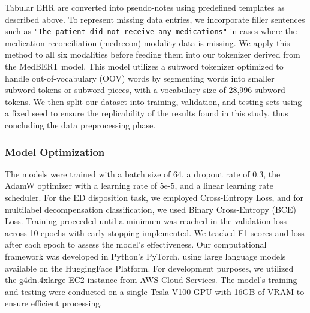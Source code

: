\documentclass[pmlr]{jmlr}%
\begin{document}
{Tabular EHR are converted into pseudo-notes using predefined templates as described above.} {To represent missing data entries, we incorporate} filler sentences such as \texttt{"The patient did not receive any medications"} in cases where the medication reconciliation (medrecon) modality data is missing. We apply this method to all six modalities before feeding them into our tokenizer derived from the MedBERT model. This model utilizes a subword tokenizer optimized to handle out-of-vocabulary (OOV) words by segmenting words into smaller subword tokens or subword pieces, with a vocabulary size of 28,996 subword tokens. We then split our dataset into training, validation, and testing sets using a fixed seed to ensure the replicability of the results found in this study, thus concluding the data preprocessing phase.

\subsubsection{Model Optimization}

The models were trained with a batch size of 64, a dropout rate of 0.3, the AdamW optimizer with a learning rate of 5e-5, and a linear learning rate scheduler. For the ED disposition task, we employed Cross-Entropy Loss, and for multilabel decompensation classification, we used Binary Cross-Entropy (BCE) Loss. Training proceeded until a minimum was reached in the validation loss across 10 epochs with early stopping implemented. We tracked F1 scores and loss after each epoch to assess the model's effectiveness. Our computational framework was developed in Python's PyTorch, using large language models available on the HuggingFace \citep{wolf2019huggingface} Platform. For development purposes, we utilized the g4dn.4xlarge EC2 instance from AWS Cloud Services. The model's training and testing were conducted on a single Tesla V100 GPU with 16GB of VRAM to ensure efficient processing.


\end{document}
